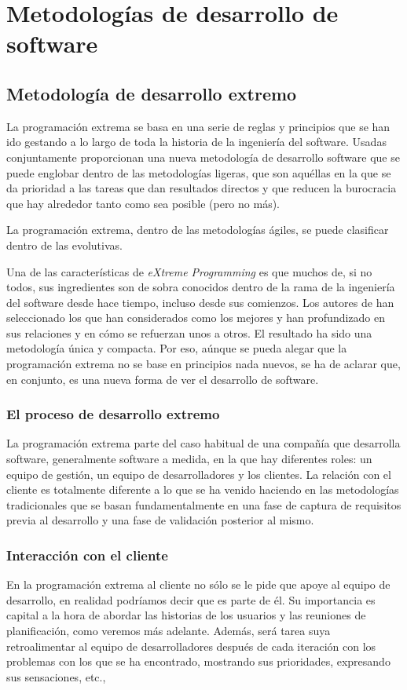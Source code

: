 \documentclass[12pt]{book} %
\begin{document}
\section{Metodologías de desarrollo de software}
	\subsection{Metodología de desarrollo extremo \label{XP}}
		La programación extrema se basa en una serie de reglas y principios que se han ido gestando a lo largo de toda la historia de la 
		ingeniería del software. Usadas conjuntamente proporcionan una nueva metodología de desarrollo software que se puede englobar 
		dentro de las metodologías ligeras, que son aquéllas en la que se da prioridad a las tareas que dan resultados directos y que 
		reducen la burocracia que hay alrededor tanto como sea posible (pero no más).
		
		La programación extrema, dentro de las metodologías ágiles, se puede clasificar dentro de las evolutivas.
		
		Una de las características de \textsl{eXtreme Programming} es que muchos de, si no todos, sus ingredientes son de sobra conocidos
		dentro de la rama de la ingeniería del software desde hace tiempo, incluso desde sus comienzos. Los autores de han seleccionado 
		los que han considerados como los mejores y han profundizado en sus relaciones y en cómo se refuerzan unos a otros. El resultado 
		ha sido una metodología única y compacta. Por eso, a\'unque se pueda alegar que la programación extrema no se base en principios
		nada nuevos, se ha de aclarar que, en conjunto, es una nueva forma de ver el desarrollo de software. 
		
		\subsubsection{El proceso de desarrollo extremo}
			La programación extrema parte del caso habitual de una compañía que desarrolla software, generalmente software a medida, en la
			que hay diferentes roles: un equipo de gestión, un equipo de desarrolladores y los clientes. 
			La relación con el cliente es totalmente diferente a lo que se ha venido haciendo en las metodologías tradicionales que se basan
			fundamentalmente en una fase de captura de requisitos previa al desarrollo y una fase de validación posterior al mismo.
			 
		\subsubsection{Interacción con el cliente }
			En la programación extrema al cliente no sólo se le pide que apoye al equipo de desarrollo, en realidad podríamos decir que es 
			parte de él. Su importancia es capital a la hora de abordar las historias de los usuarios y las reuniones de planificación, como 
			veremos más adelante. Además, será tarea suya retroalimentar al equipo de desarrolladores después de cada iteración con los 
			problemas con los que se ha encontrado, mostrando sus prioridades, expresando sus sensaciones, etc.,
			
\end{document}
